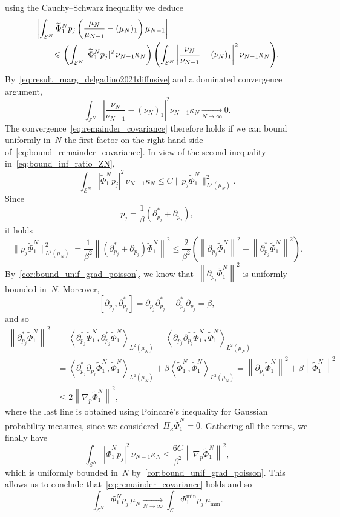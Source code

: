 \documentclass[onefignum,onetabnum]{siamart251216} %
\newcommand{\norm}[1]{\left\lVert#1\right\rVert}
\newcommand{\mc}[1]{\mathcal{#1}}
\renewcommand{\leq}{\leqslant}
\renewcommand{\le}{\leqslant}
\newcommand{\mescin}{\mu}
\newcommand{\mespos}{\nu}
\newcommand{\mesvit}{\kappa}
\newcommand{\projvit}{\Pi_{\kappa}}
\newcommand{\slangle}[1]{\left\langle #1 \right\rangle}
\theoremstyle{plain}
\numberwithin{equation}{section}
\numberwithin{theorem}{section}
\begin{document}
using the Cauchy--Schwarz inequality we deduce
\begin{align}
    \notag
    &\left|\int_{\mc{E}^N}\widetilde\Phi^N_1 p_j\left(\frac{\mescin_N}{\mescin_{N-1}}-(\mescin_{N})_1\right)\mescin_{N-1}\right| \\
    \label{eq:bound_remainder_covariance}
    &\qquad\leq \left(\int_{\mc{E}^N}|\widetilde\Phi^N_1 p_j|^2\,\mespos_{N-1}\mesvit_N \right)\left(\int_{\mc{E}^N}\left|\frac{\mespos_N}{\mespos_{N-1}} - (\mespos_N)_1\right|^2\mespos_{N-1}\mesvit_N\right)\!.
\end{align}
By~\eqref{eq:result_marg_delgadino2021diffusive} and a dominated convergence argument,
\[
\int_{\mc{E}^N}\left|\frac{\mespos_N}{\mespos_{N-1}} - (\mespos_N)_1\right|^2\mespos_{N-1}\mesvit_N
\xrightarrow[N\to \infty]{} 0.
\]
The convergence~\eqref{eq:remainder_covariance} therefore holds if we can bound uniformly in~$N$ the 
first factor on the right-hand side of~\eqref{eq:bound_remainder_covariance}.
In view of the second inequality in~\eqref{eq:bound_inf_ratio_ZN},
\[
\int_{\mc{E}^N}|\widetilde\Phi^N_1 p_j|^2\,\mespos_{N-1}\mesvit_N \leq C \|p_j\widetilde\Phi^N_1\|_{L^2(\mescin_N)}^2.
\]
Since
\[
p_j = \frac{1}{\beta}(\partial^*_{p_j} + \partial_{p_j}),
\]
it holds
\[
\|p_j\widetilde\Phi^N_1\|_{L^2(\mescin_N)}^2
= \frac{1}{\beta^2}\norm{(\partial^*_{p_j} + \partial_{p_j})\widetilde\Phi_1^N}^2
\le \frac{2}{\beta^2}\left(\norm{\partial_{p_j}\widetilde\Phi_1^N}^2+\norm{\partial^*_{p_j}\widetilde\Phi_1^N}^2\right)\!.
\]
By~\cref{cor:bound_unif_grad_poisson}, we know that~$\norm{\partial_{p_j}\widetilde\Phi_1^N}^2$ is uniformly bounded in~$N$. Moreover,
\[
[\partial_{p_j},\partial_{p_j}^*]=\partial_{p_j}\partial^*_{p_j} - \partial^*_{p_j}\partial_{p_j} = \beta,
\]
and so
\begin{align*}
\norm{\partial^*_{p_j}\widetilde\Phi_1^N}^2 &= \slangle{\partial^*_{p_j}\widetilde\Phi_1^N,\partial^*_{p_j}\widetilde\Phi_1^N}_{L^2(\mescin_N)}
= \slangle{\partial_{p_j}\partial^*_{p_j}\widetilde\Phi_1^N,\widetilde\Phi_1^N}_{L^2(\mescin_N)} \\
& = \slangle{\partial_{p_j}^*\partial_{p_j}\widetilde\Phi_1^N,\widetilde\Phi_1^N}_{L^2(\mescin_N)} + \beta\slangle{\widetilde\Phi_1^N,\widetilde\Phi_1^N}_{L^2(\mescin_N)} = \norm{\partial_{p_j}\widetilde\Phi_1^N}^2 + \beta \norm{\widetilde\Phi_1^N}^2 \\
& \leq 2 \norm{\nabla_p\widetilde\Phi_1^N}^2,
\end{align*}
where the last line is obtained using Poincaré's inequality for Gaussian probability measures, since we considered~$\projvit\widetilde\Phi_1^N = 0$.
Gathering all the terms, we finally have
\[
\int_{\mc{E}^N}|\widetilde\Phi^N_1 p_j|^2\,\mespos_{N-1}\mesvit_N \leq \frac{6C}{\beta^2}\norm{\nabla_p\widetilde\Phi_1^N}^2,
\]
which is uniformly bounded in~$N$ by~\cref{cor:bound_unif_grad_poisson}. This allows us to conclude that~\eqref{eq:remainder_covariance} holds
and so
\[
\int_{\mc{E}^N}\Phi^N_1 p_j\,\mescin_{N} \xrightarrow[N\to \infty]{}\int_{\mc{E}}\Phi^{\min}_1 p_j\,\mescin_{{\min}}.
\]
\end{document}
